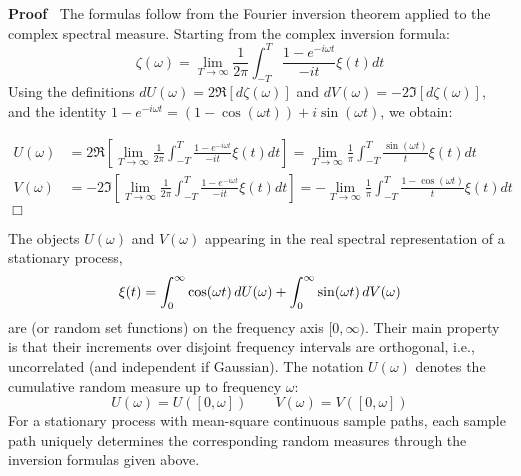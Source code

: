 \documentclass{article}
\newcommand{\tmtextit}[1]{\text{{\itshape{#1}}}}
\newenvironment{proof}{\noindent\textbf{Proof\ }}{\hspace*{\fill}$\Box$\medskip}
\begin{document}
\begin{proof}
  The formulas follow from the Fourier inversion theorem applied to the
  complex spectral measure. Starting from the complex inversion formula:
  \begin{equation}
    \zeta (\omega) = \lim_{T \to \infty}  \frac{1}{2 \pi}  \int_{- T}^T
    \frac{1 - e^{- i \omega t}}{- it} \xi (t) dt
  \end{equation}
  Using the definitions $dU (\omega) = 2 \Re [d \zeta (\omega)]$ and $dV
  (\omega) = - 2 \Im [d \zeta (\omega)]$, and the identity $1 - e^{- i \omega
  t} = (1 - \cos (\omega t)) + i \sin (\omega t)$, we obtain:
  
  \begin{align}
    U (\omega) & = 2 \Re \left[ \lim_{T \to \infty}  \frac{1}{2 \pi}  \int_{-
    T}^T \frac{1 - e^{- i \omega t}}{- it} \xi (t) dt \right] = \lim_{T \to
    \infty}  \frac{1}{\pi}  \int_{- T}^T \frac{\sin (\omega t)}{t} \xi (t) dt
    \\
    V (\omega) & = - 2 \Im \left[ \lim_{T \to \infty}  \frac{1}{2 \pi} 
    \int_{- T}^T \frac{1 - e^{- i \omega t}}{- it} \xi (t) dt \right] = -
    \lim_{T \to \infty}  \frac{1}{\pi}  \int_{- T}^T \frac{1 - \cos (\omega
    t)}{t} \xi (t) dt 
  \end{align}
\end{proof}

\begin{remark}
  The objects $U (\omega)$ and $V (\omega)$ appearing in the real spectral
  representation of a stationary process,
  \begin{equation}
    \xi (t) = \int_0^{\infty} \cos (\omega t)  \hspace{0.17em} dU (\omega) +
    \int_0^{\infty} \sin (\omega t)  \hspace{0.17em} dV (\omega)
  \end{equation}
  are \tmtextit{random measures} (or random set functions) on the frequency
  axis $[0, \infty)$. Their main property is that their increments over
  disjoint frequency intervals are orthogonal, i.e., uncorrelated (and
  independent if Gaussian). The notation $U (\omega)$ denotes the cumulative
  random measure up to frequency $\omega$:
  \begin{equation}
    U (\omega) = U ([0, \omega])  \qquad V (\omega) = V ([0, \omega])
  \end{equation}
  For a stationary process with mean-square continuous sample paths, each
  sample path uniquely determines the corresponding random measures through
  the inversion formulas given above.
\end{remark}
\end{document}
